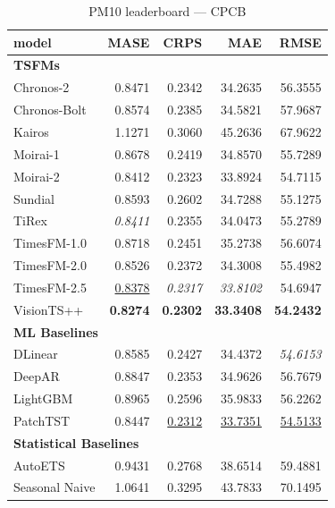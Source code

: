 \begin{table}[H]
\caption{PM10 leaderboard --- CPCB}
\centering
\begin{small}
\begin{tabular}{lrrrr}
\toprule
model & MASE & CRPS & MAE & RMSE \\
\midrule
\multicolumn{5}{l}{\textbf{TSFMs}} \\
Chronos-2 & 0.8471 & 0.2342 & 34.2635 & 56.3555 \\
Chronos-Bolt & 0.8574 & 0.2385 & 34.5821 & 57.9687 \\
Kairos & 1.1271 & 0.3060 & 45.2636 & 67.9622 \\
Moirai-1 & 0.8678 & 0.2419 & 34.8570 & 55.7289 \\
Moirai-2 & 0.8412 & 0.2323 & 33.8924 & 54.7115 \\
Sundial & 0.8593 & 0.2602 & 34.7288 & 55.1275 \\
TiRex & \textit{0.8411} & 0.2355 & 34.0473 & 55.2789 \\
TimesFM-1.0 & 0.8718 & 0.2451 & 35.2738 & 56.6074 \\
TimesFM-2.0 & 0.8526 & 0.2372 & 34.3008 & 55.4982 \\
TimesFM-2.5 & \underline{0.8378} & \textit{0.2317} & \textit{33.8102} & 54.6947 \\
VisionTS++ & \textbf{0.8274} & \textbf{0.2302} & \textbf{33.3408} & \textbf{54.2432} \\
\midrule
\multicolumn{5}{l}{\textbf{ML Baselines}} \\
DLinear & 0.8585 & 0.2427 & 34.4372 & \textit{54.6153} \\
DeepAR & 0.8847 & 0.2353 & 34.9626 & 56.7679 \\
LightGBM & 0.8965 & 0.2596 & 35.9833 & 56.2262 \\
PatchTST & 0.8447 & \underline{0.2312} & \underline{33.7351} & \underline{54.5133} \\
\midrule
\multicolumn{5}{l}{\textbf{Statistical Baselines}} \\
AutoETS & 0.9431 & 0.2768 & 38.6514 & 59.4881 \\
Seasonal Naive & 1.0641 & 0.3295 & 43.7833 & 70.1495 \\
\bottomrule
\end{tabular}
\end{small}
\end{table}